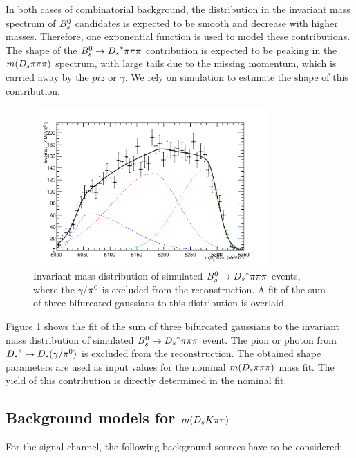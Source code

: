 In both cases of combinatorial background, the distribution in the invariant mass spectrum of ${{B}^0_{s}}$ candidates is expected to be smooth and decrease with higher masses. 
Therefore, one exponential function is used to model these contributions. \newline
The shape of the  ${{B}^0_{s}}\rightarrow{\ensuremath{{D}_{s}}}^{*}{\pi}{\pi}{\pi}$ contribution is expected to be peaking in the $m({{D}_{s}}{\pi}{\pi}{\pi})$ spectrum, with large tails due to the missing momentum, which is carried away by the $piz$ or $\gamma$. 
We rely on simulation to estimate the shape of this contribution. 

\begin{figure}[h]
\includegraphics[height=8.cm,width=0.80\textwidth]{figs/Bs2Dsstartpipipi.pdf}
\caption{Invariant mass distribution of simulated ${{B}^0_{s}}\rightarrow{\ensuremath{{D}_{s}}}^{*}{\pi}{\pi}{\pi}$ events, where the $\gamma$/${{\pi}^0}$ is excluded from the reconstruction. 
A fit of the sum of three bifurcated gaussians to this distribution is overlaid.}
\label{fig: BsDsstar3piMC}
\end{figure}

Figure \ref{fig: BsDsstar3piMC} shows the fit of the sum of three bifurcated gaussians to the invariant mass distribution of simulated ${{B}^0_{s}}\rightarrow{\ensuremath{{D}_{s}}}^{*}{\pi}{\pi}{\pi}$ event. 
The pion or photon from ${{D}_{s}}^{*}\rightarrow{\ensuremath{{D}_{s}}}(\gamma/{{\pi}^0})$ is excluded from the reconstruction. The obtained shape parameters are used as input values for the nominal $m({{D}_{s}}{\pi}{\pi}{\pi})$ mass fit. 
The yield of this contribution is directly determined in the nominal fit. 


\subsection{Background models for $m({{D}_{s}}{K}{\pi}{\pi})$}
For the signal channel, the following background sources have to be considered:

